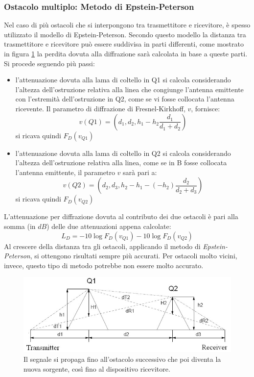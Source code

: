\subsubsection*{Ostacolo multiplo: Metodo di Epstein-Peterson}
\label{sec:epsteinpeterson}
Nel caso di più ostacoli che si interpongono tra trasmettitore e ricevitore, è spesso utilizzato il modello di Epstein-Peterson.
Secondo questo modello la distanza tra trasmettitore e ricevitore può essere suddivisa in parti differenti, come mostrato in figura
\ref{img:epsteinpeterson} la perdita dovuta alla diffrazione sarà calcolata in base a queste parti. Si procede seguendo più passi:
\begin{itemize}
\item  l'attenuazione dovuta alla lama di coltello in Q1 si calcola considerando l'altezza dell'ostruzione relativa alla linea che 
congiunge l'antenna emittente con l'estremità dell'ostruzione in Q2, come se vi fosse collocata l'antenna ricevente. Il parametro 
di diffrazione di Fresnel-Kirkhoff, $v$, fornisce:
\[
v(Q1) = (d_{1},d_{2},h_{1}-h_{2}\frac{d_{1}}{d_{1}+d_{2}})
\]
si ricava quindi $F_{D}(v_{Q1})$
\item l'attenuazione dovuta alla lama di coltello in Q2 si calcola considerando l'altezza dell'ostruzione relativa alla linea, come 
se in B fosse collocata l'antenna emittente, il parametro $v$ sarà pari a:
\[
v(Q2) = (d_{2},d_{3},h_{2}-h_{1}-(-h_{2})\frac{d_{2}}{d_{2}+d_{3}})
\]
si ricava quindi $F_{D}(v_{Q2})$
\end{itemize}
L'attenuazione per diffrazione dovuta al contributo dei due ostacoli è pari alla somma (in $dB$) delle due attenuazioni appena calcolate:
\[
L_{D} = -10 \log F_{D}(v_{Q1}) - 10 \log F_{D}(v_{Q2})
\]
Al crescere della distanza tra gli ostacoli, applicando il metodo di \emph{Epstein-Peterson}, si ottengono risultati sempre più accurati.
Per ostacoli molto vicini, invece, questo tipo di metodo potrebbe non essere molto accurato.
\begin{figure}[h]
\centering
\includegraphics[height=0.3\textwidth]{Immagini/epsteinpeterson}
\caption{Il segnale si propaga fino all'ostacolo successivo che poi diventa la nuova sorgente, così fino al dispositivo ricevitore.}
\label{img:epsteinpeterson}
\end{figure}

